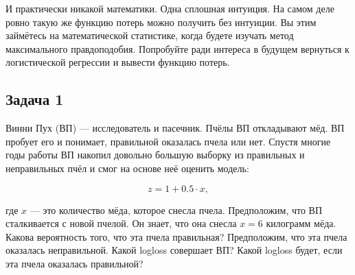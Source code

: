 \documentclass[12pt, a4paper, oneside]{article}
\begin{document}
И практически никакой математики. Одна сплошная интуиция. На самом деле ровно такую же функцию потерь можно получить без интуиции. Вы этим займётесь на математической статистике, когда будете изучать метод максимального правдоподобия. Попробуйте ради интереса в будущем вернуться к логистической регрессии и вывести функцию потерь. 



\subsection*{Задача 1}

Винни Пух (ВП) --- исследователь и пасечник. Пчёлы ВП откладывают мёд. ВП пробует его и понимает, правильной оказалась пчела или нет. Спустя многие годы работы ВП накопил довольно большую выборку из правильных и неправильных пчёл и смог на основе неё оценить модель: 

$$ 
z = 1 + 0.5 \cdot x,
$$

где $x$ --- это количество мёда, которое снесла пчела.  Предположим, что ВП сталкивается с новой пчелой. Он знает, что она снесла $x = 6$ килограмм мёда. Какова вероятность того, что эта пчела правильная? Предположим, что эта пчела оказалась неправильной. Какой logloss совершает ВП? Какой logloss будет, если эта пчела оказалась правильной? 

\end{document}
